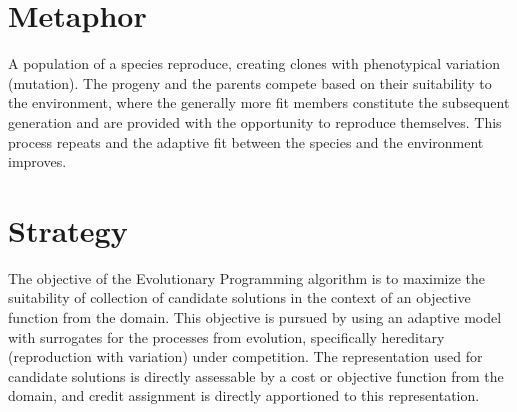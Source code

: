 \documentclass[a4paper, 11pt]{article}
\begin{document}
\section{Metaphor}
\label{sec:metaphor}
A population of a species reproduce, creating clones with phenotypical variation (mutation). The progeny and the parents compete based on their suitability to the environment, where the generally more fit members constitute the subsequent generation and are provided with the opportunity to reproduce themselves. This process repeats and the adaptive fit between the species and the environment improves.

\section{Strategy}
\label{sec:strategy}
The objective of the Evolutionary Programming algorithm is to maximize the suitability of collection of candidate solutions in the context of an objective function from the domain.
This objective is pursued by using an adaptive model with surrogates for the processes from evolution, specifically hereditary (reproduction with variation) under competition. The representation used for candidate solutions is directly assessable by a cost or objective function from the domain, and credit assignment is directly apportioned to this representation. 
\end{document}
